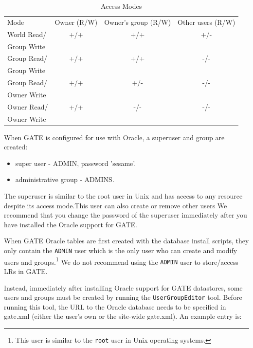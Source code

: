 \begin{table}[htbp]
\begin{tabular} {|l|c|c|c|} \hline
Mode&Owner (R/W)& Owner's group (R/W) &Other users (R/W)\\
\cline{1-4}
World Read/ & +/+ & +/+ & +/- \\
Group Write & & & \\ \cline{1-4}
Group Read/ & +/+ & +/+ & -/- \\
Group Write & & & \\ \cline{1-4}
Group Read/ & +/+ & +/- & -/- \\
Owner Write & & & \\ \cline{1-4}
Owner Read/ & +/+ & -/- & -/- \\
Owner Write & & & \\ \cline{1-4}

\end{tabular}
\caption{Access Modes}
\label{table:access_modes}
\end{table}


When GATE is configured for use with Oracle, a superuser and group
are created:

\begin{itemize}
    \item super user - ADMIN, password  'sesame'.
    \item administrative group - ADMINS.
\end{itemize}

The superuser is similar to the root user in Unix and has access
to any resource despite its access mode.This user can also create
or remove other users We recommend that you change the password of
the superuser immediately after you have installed the Oracle
support for GATE.



When GATE Oracle tables are first created with the database
install scripts, they only contain the {\tt ADMIN} user which is
the only user who can create and modify users and
groups.\footnote{This user is similar to the {\tt root} user in
Unix operating systems.} We do not recommend using the {\tt ADMIN}
user to store/access LRs in GATE.

Instead, immediately after installing Oracle support for GATE
datastores, some users and groups must be created by running the
{\tt UserGroupEditor} tool. Before running this tool, the URL to
the Oracle database needs to be specified in gate.xml (either the
user's own or the site-wide gate.xml). An example entry is:


